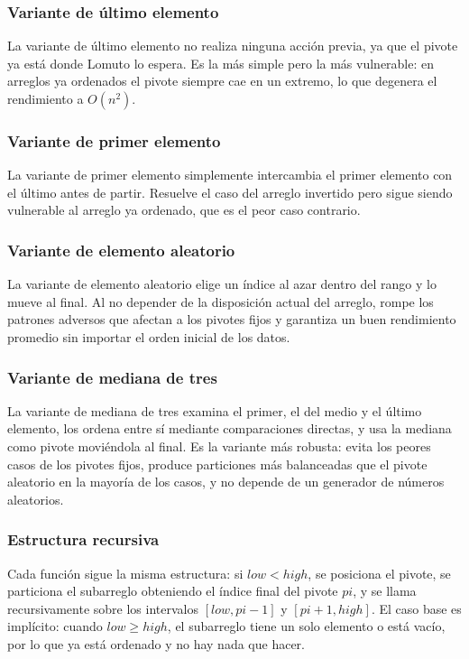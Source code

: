 \subsubsection{Variante de último elemento}
La variante de último elemento no realiza ninguna acción previa, ya que el pivote ya está donde Lomuto lo espera. Es la más simple pero la más vulnerable: en arreglos ya ordenados el pivote siempre cae en un extremo, lo que degenera el rendimiento a $O(n^2)$.

\subsubsection{Variante de primer elemento}
La variante de primer elemento simplemente intercambia el primer elemento con el último antes de partir. Resuelve el caso del arreglo invertido pero sigue siendo vulnerable al arreglo ya ordenado, que es el peor caso contrario.

\subsubsection{Variante de elemento aleatorio}
La variante de elemento aleatorio elige un índice al azar dentro del rango y lo mueve al final. Al no depender de la disposición actual del arreglo, rompe los patrones adversos que afectan a los pivotes fijos y garantiza un buen rendimiento promedio sin importar el orden inicial de los datos.

\subsubsection{Variante de mediana de tres}
La variante de mediana de tres examina el primer, el del medio y el último elemento, los ordena entre sí mediante comparaciones directas, y usa la mediana como pivote moviéndola al final. Es la variante más robusta: evita los peores casos de los pivotes fijos, produce particiones más balanceadas que el pivote aleatorio en la mayoría de los casos, y no depende de un generador de números aleatorios.

\subsubsection{Estructura recursiva}
Cada función sigue la misma estructura: si \( low < high \), se posiciona el pivote, se particiona el subarreglo obteniendo el índice final del pivote \( pi \), y se llama recursivamente sobre los intervalos \([low, pi-1]\) y \([pi+1, high]\). El caso base es implícito: cuando \( low \geq high \), el subarreglo tiene un solo elemento o está vacío, por lo que ya está ordenado y no hay nada que hacer.


